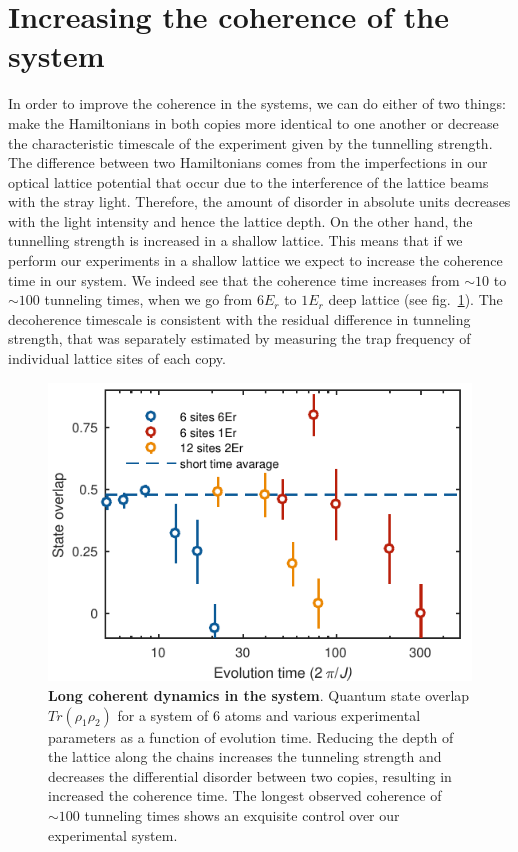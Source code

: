 \section{Increasing the coherence of the system}
In order to improve the coherence in the systems, we can do either of two things: make the Hamiltonians in both copies more identical to one another or decrease the characteristic \linebreak timescale of the experiment given by the tunnelling strength. The difference between two Hamiltonians comes from the imperfections in our optical lattice potential that occur due to the interference of the lattice beams with the stray light. Therefore, the amount of disorder in absolute units decreases with the light intensity and hence the lattice depth. On the other hand, the tunnelling strength is increased in a shallow lattice. This means that if we perform our experiments in a shallow lattice we expect to increase the coherence time in our system. We indeed see that the coherence time increases from $\sim 10$ to $\sim 100$ tunneling times, when we go from $6 E_r$ to $1 E_r$ deep lattice (see fig.~\ref{fig:CBH_MBP_long_time}). The decoherence timescale is consistent with the residual difference in tunneling strength, that was separately estimated by measuring the trap frequency of individual lattice sites of each copy. 

\begin{figure}[t]
	\centering
	\includegraphics[scale=1]{figures/CBH_MBP_long_time.pdf}
	\caption{{\bf Long coherent dynamics in the system}. Quantum state overlap $Tr(\rho_1 \rho_2) $ for a system of $6$ atoms and various experimental parameters as a function of evolution time. Reducing the depth of the lattice along the chains increases the tunneling strength and decreases the differential disorder between two copies, resulting in increased the coherence time. The longest observed coherence of $\sim 100$ tunneling times shows an exquisite control over our experimental system.}
	\label{fig:CBH_MBP_long_time}
\end{figure}

